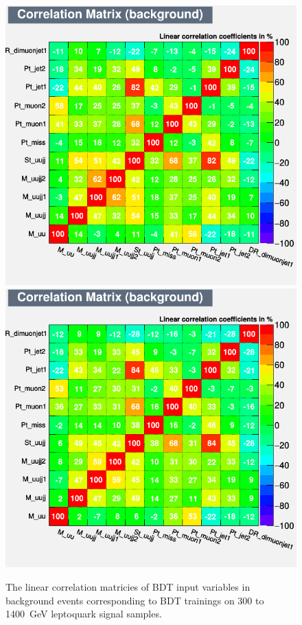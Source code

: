 \begin{figure}[H]
    {\includegraphics[width=.30\textwidth]{Images/Analysis/Results_LQToBMu_pair_uubj_BDTG_FullRun2_2023_01_25_020318/1300/CorrelationMatrixB.png}}
    {\includegraphics[width=.30\textwidth]{Images/Analysis/Results_LQToBMu_pair_uubj_BDTG_FullRun2_2023_01_25_020318/1400/CorrelationMatrixB.png}}
    \caption{The linear correlation matricies of BDT input variables in background events corresponding to BDT trainings on 300 to \SI{1400}{GeV} leptoquark signal samples.}
    \label{figapp:correlationsBkg1}
\end{figure}

